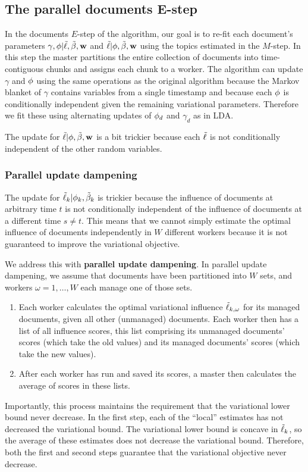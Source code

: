 \subsection*{The parallel documents E-step}
In the documents $E$-step of the algorithm, our goal is to re-fit each
document's parameters $\gamma, \phi | \tilde{\ell}, \tilde{\beta}, \textbf{w}$ and $\tilde{\ell} |
\phi, \tilde{\beta}, \textbf{w} $ using the topics estimated in the $M$-step.  In this
step the master partitions the entire collection of documents into
time-contiguous chunks and assigns each chunk to a worker. The
algorithm can update $\gamma$ and $\phi$ using the same operations as
the original algorithm because the Markov blanket of $\gamma$ contains
variables from a single timestamp and because each $\phi$ is
conditionally independent given the remaining variational parameters.
Therefore we fit these using alternating updates of $\phi_{d}$ and
$\gamma_d$ as in LDA.

The update for $\tilde{\ell} | \phi, \tilde{\beta}, \textbf{w}$ is a bit trickier because each
$\tilde{\ell}$ is not conditionally independent of the other random
variables.


\subsubsection*{Parallel update dampening}

The update for $\tilde{\ell}_{k} | \phi_k, \tilde{\beta}_k$ is trickier because the
influence of documents at arbitrary time $t$ is not conditionally
independent of the influence of documents at a different time $s \neq
t$.  This means that we cannot simply estimate the optimal influence
of documents independently in $W$ different workers because it is not
guaranteed to improve the variational objective.

We address this with \textbf{parallel update dampening}.  In parallel
update dampening, we assume that documents have been partitioned into
$W$ sets, and workers $\omega = 1, \ldots, W$ each manage one of those
sets.

\begin{enumerate}
\item Each worker calculates the optimal variational influence
  $\tilde{\ell}_{k,\omega}$ for its managed documents, given all other
  (unmanaged) documents.  Each worker then has a list of all influence
  scores, this list comprising its unmanaged documents' scores (which take the
  old values) and its managed documents' scores (which take the new
  values).
  
\item After each worker has run and saved its scores, a master then
  calculates the average of scores in these lists.
\end{enumerate}
Importantly, this process maintains the requirement that the
variational lower bound never decrease.  In the first step, each of
the ``local'' estimates has not decreased the variational bound.  The
variational lower bound is concave in $\tilde{\ell}_{k}$, so the average of
these estimates does not decrease the variational bound.  Therefore,
both the first and second steps guarantee that the variational
objective never decrease.

